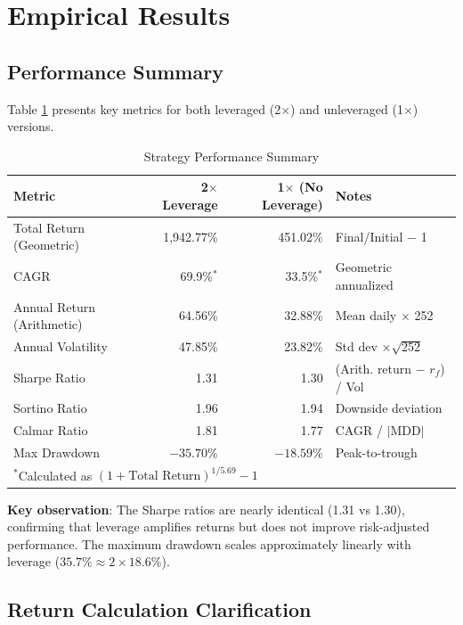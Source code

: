 \documentclass[12pt,a4paper]{article}
\theoremstyle{definition}
\begin{document}
\section{Empirical Results}
\label{sec:results}

\subsection{Performance Summary}

Table \ref{tab:performance} presents key metrics for both leveraged (2$\times$) and unleveraged (1$\times$) versions.

\begin{table}[H]
\centering
\caption{Strategy Performance Summary}
\label{tab:performance}
\begin{tabular}{lrrl}
\toprule
\textbf{Metric} & \textbf{2$\times$ Leverage} & \textbf{1$\times$ (No Leverage)} & \textbf{Notes} \\
\midrule
Total Return (Geometric) & 1,942.77\% & 451.02\% & Final/Initial $-$ 1 \\
CAGR & 69.9\%$^*$ & 33.5\%$^*$ & Geometric annualized \\
Annual Return (Arithmetic) & 64.56\% & 32.88\% & Mean daily $\times$ 252 \\
Annual Volatility & 47.85\% & 23.82\% & Std dev $\times \sqrt{252}$ \\
Sharpe Ratio & 1.31 & 1.30 & (Arith. return $-$ $r_f$) / Vol \\
Sortino Ratio & 1.96 & 1.94 & Downside deviation \\
Calmar Ratio & 1.81 & 1.77 & CAGR / $|$MDD$|$ \\
Max Drawdown & $-35.70\%$ & $-18.59\%$ & Peak-to-trough \\
\bottomrule
\multicolumn{4}{l}{\footnotesize $^*$Calculated as $(1+\text{Total Return})^{1/5.69}-1$}
\end{tabular}
\end{table}

\textbf{Key observation}: The Sharpe ratios are nearly identical (1.31 vs 1.30), confirming that leverage amplifies returns but does not improve risk-adjusted performance. The maximum drawdown scales approximately linearly with leverage ($35.7\% \approx 2 \times 18.6\%$).

\subsection{Return Calculation Clarification}
\end{document}
